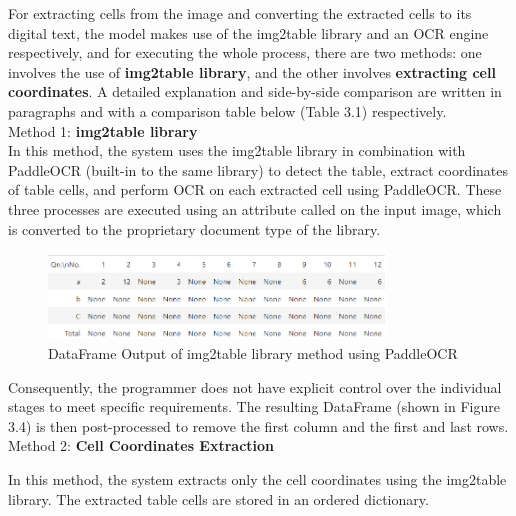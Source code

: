 \noindent For extracting cells from the image and converting the extracted cells to its digital text, the model makes use of the img2table library and an OCR engine respectively, and for executing the whole process, there are two methods: one involves the use of \textbf{img2table library}, and the other involves \textbf{extracting cell coordinates}. A detailed explanation and side-by-side comparison are written in paragraphs and with a comparison table below (Table 3.1) respectively.\\

\noindent Method 1: \textbf{img2table library}\\

\noindent In this method, the system uses the img2table library in combination with PaddleOCR (built-in to the same library) to detect the table, extract coordinates of table cells, and perform OCR on each extracted cell using PaddleOCR. These three processes are executed using an attribute called on the input image, which is converted to the proprietary document type of the library.\\

\begin{figure}[h!]
  \centering
  \includegraphics[width=0.8\textwidth]{Images/prop_sys/paddle_ocr_output.png}
  \caption{DataFrame Output of img2table library method using PaddleOCR}
\end{figure}

\noindent  Consequently, the programmer does not have explicit control over the individual stages to meet specific requirements. The resulting DataFrame (shown in Figure 3.4) is then post-processed to remove the first column and the first and last rows.\\


\noindent Method 2: \textbf{Cell Coordinates Extraction}

\vspace{1mm}

\noindent In this method, the system extracts only the cell coordinates using the img2table library. The extracted table cells are stored in an ordered dictionary.

